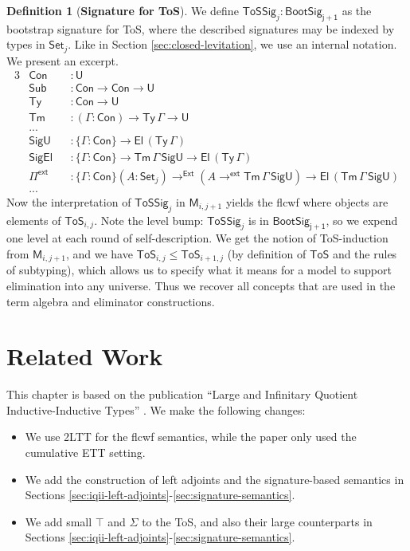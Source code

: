 \documentclass[12pt,a4paper,twoside,openany]{book}
\theoremstyle{remark}
\theoremstyle{definition}
\newtheorem{mydefinition}{Definition}
\theoremstyle{theorem}
\newcommand{\ms}[1]{\mathsf{#1}}
\newcommand{\bs}[1]{\boldsymbol{#1}}
\newcommand{\Con}{\mathsf{Con}}
\newcommand{\Sub}{\mathsf{Sub}}
\newcommand{\Tm}{\mathsf{Tm}}
\newcommand{\Ty}{\mathsf{Ty}}
\newcommand{\U}{\mathsf{U}}
\newcommand{\El}{\mathsf{El}}
\newcommand{\Set}{\mathsf{Set}}
\newcommand{\ToS}{\mathsf{ToS}}
\newcommand{\toe}{\to^{\ms{Ext}}}
\newcommand{\Piinf}{\Pi^{\mathsf{ext}}}
\newcommand{\toinf}{\to^{\ms{ext}}}
\newcommand{\ToSSig}{\mathsf{ToSSig}}
\newcommand{\bM}{\bs{\mathsf{M}}}
\begin{document}
\begin{mydefinition}[\textbf{Signature for ToS}]
We define $\ToSSig_j : \ms{BootSig_{j+1}}$ as the bootstrap signature for ToS, where the
described signatures may be indexed by types in $\Set_j$. Like in Section
\ref{sec:closed-levitation}, we use an internal notation. We present an excerpt.
\begingroup
\allowdisplaybreaks
\begin{alignat*}{3}
  & \Con       &&: \U\\
  & \Sub       &&: \Con \to \Con \to \U\\
  & \Ty        &&: \Con \to \U\\
  & \Tm        &&: (\Gamma : \Con) \to \Ty\,\Gamma \to \U\\
  & ...        &&\\
  & \ms{SigU}  &&: \{\Gamma : \Con\} \to \El\,(\Ty\,\Gamma)\\
  & \ms{SigEl} &&: \{\Gamma : \Con\} \to \Tm\,\Gamma\,\ms{SigU} \to \El\,(\Ty\,\Gamma)\\
  & \Piinf     &&: \{\Gamma : \Con\}(A : \Set_j) \toe (A \toinf \Tm\,\Gamma\,\ms{SigU}) \to \El\,(\Tm\,\Gamma\,\ms{SigU})\\
  & ...        &&
\end{alignat*}
Now the interpretation of $\ToSSig_j$ in $\bM_{i,j+1}$ yields the flcwf where
objects are elements of $\ToS_{i,j}$. Note the level bump: $\ToSSig_j$ is in
$\ms{BootSig_{j+1}}$, so we expend one level at each round of self-description.
We get the notion of ToS-induction from $\bM_{i,j+1}$, and we have $\ToS_{i,j}
\leq \ToS_{i+1,j}$ (by definition of $\ToS$ and the rules of subtyping), which
allows us to specify what it means for a model to support elimination into any
universe. Thus we recover all concepts that are used in the term algebra and
eliminator constructions.
\end{mydefinition}
\endgroup


\section{Related Work}
\label{sec:iqii-related-work}

This chapter is based on the publication ``Large and Infinitary Quotient
Inductive-Inductive Types'' \cite{iqiit}. We make the following changes:
\begin{itemize}
  \item We use 2LTT for the flcwf semantics, while the paper only used the cumulative
        ETT setting.
  \item We add the construction of left adjoints and the signature-based semantics in
        Sections \ref{sec:iqii-left-adjoints}-\ref{sec:signature-semantics}.
  \item We add small $\top$ and $\Sigma$ to the ToS, and also their large counterparts
        in Sections \ref{sec:iqii-left-adjoints}-\ref{sec:signature-semantics}.
\end{itemize}
\end{document}
